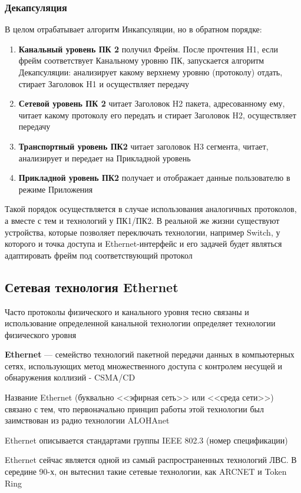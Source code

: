 \documentclass[a4paper]{article}
\begin{document}
\subsubsection{Декапсуляция}
В целом отрабатывает алгоритм Инкапсуляции, но в обратном порядке:
\begin{enumerate}
	\item \textbf{Канальный уровень ПК 2} получил Фрейм. После прочтения H1, если фрейм соответствует Канальному уровню ПК, запускается алгоритм Декапсуляции: анализирует какому верхнему уровню (протоколу) отдать, стирает Заголовок H1 и осуществляет передачу
	\item \textbf{Сетевой уровень ПК 2} читает Заголовок H2 пакета, адресованному ему, читает какому протоколу его передать и стирает Заголовок H2, осуществляет передачу
	\item \textbf{Транспортный уровень ПК2} читает заголовок H3 сегмента, читает, анализирует и передает на Прикладной уровень
	\item \textbf{Прикладной уровень ПК2} получает и отображает данные пользователю в режиме Приложения
\end{enumerate}

Такой порядок осуществляется в случае использования аналогичных протоколов, а вместе с тем и технологий у ПК1/ПК2. В реальной же жизни существуют устройства, которые позволяет переключать технологии, например Switch, у которого и точка доступа и Ethernet-интерфейс и его задачей будет являться адаптировать фрейм под соответствующий протокол

\subsection{Сетевая технология Ethernet}
Часто протоколы физического и канального уровня тесно связаны и использование определенной канальной технологии определяет технологии физического уровня

\textbf{Ethernet} --- семейство технологий пакетной передачи данных в компьютерных сетях, использующих метод множественного доступа с контролем несущей и обнаружения коллизий - CSMA/CD 

Название Ethernet (буквально <<эфирная сеть>> или <<среда сети>>) связано с тем, что первоначально принцип работы этой технологии был заимствован из радио технологии ALOHAnet

Ethernet описывается стандартами группы IEEE 802.3 (номер спецификации)

Ethernet сейчас является одной из самый распространенных технологий ЛВС. В середине 90-х, он вытеснил такие сетевые технологии, как ARCNET и Token Ring
\end{document}

